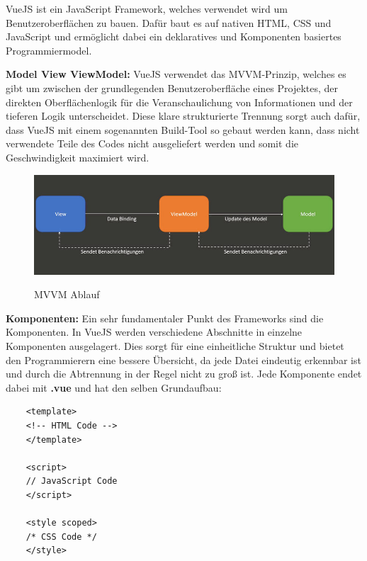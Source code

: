 VueJS ist ein JavaScript Framework, welches verwendet wird um Benutzeroberflächen zu bauen. Dafür baut es auf nativen HTML, CSS und JavaScript und ermöglicht dabei ein deklaratives und Komponenten basiertes Programmiermodel. 
\cite{frontend_web_vuejs_introduction}

\textbf{Model View ViewModel:}
\newline
VueJS verwendet das MVVM-Prinzip, welches es gibt um zwischen der grundlegenden Benutzeroberfläche eines Projektes, der direkten Oberflächenlogik für die Veranschaulichung von Informationen und der tieferen Logik unterscheidet. Diese klare strukturierte Trennung sorgt auch dafür, dass VueJS mit einem sogenannten Build-Tool so gebaut werden kann, dass nicht verwendete Teile des Codes nicht ausgeliefert werden und somit die Geschwindigkeit maximiert wird. 

\begin{figure}[h]
    \centering
    \includegraphics[width=1\textwidth]{pics/vuejs-mvvm.jpeg}
    \caption{MVVM Ablauf}
    \cite{frontend_web_mvvm}
    \label{fig:mesh1}
\end{figure}

\cite{frontend_web_mvvm}

\textbf{Komponenten:}
\newline
Ein sehr fundamentaler Punkt des Frameworks sind die Komponenten. In VueJS werden verschiedene Abschnitte in einzelne Komponenten ausgelagert. Dies sorgt für eine einheitliche Struktur und bietet den Programmierern eine bessere Übersicht, da jede Datei eindeutig erkennbar ist und durch die Abtrennung in der Regel nicht zu groß ist. Jede Komponente endet dabei mit \textbf{.vue} und hat den selben Grundaufbau:

\cite{frontend_web_vuejs_components}
\newline

\begin{lstlisting}
    <template>
    <!-- HTML Code -->
    </template>
    
    <script>
    // JavaScript Code
    </script>
    
    <style scoped>
    /* CSS Code */
    </style>
\end{lstlisting}


